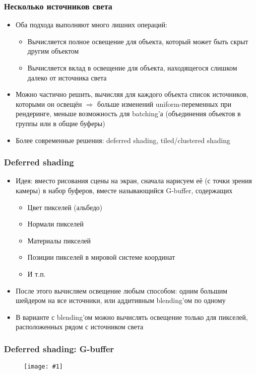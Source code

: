 \documentclass{beamer}
\newcommand{\slideimage}[1]{
  \begin{figure}
    \begin{adjustbox}{width=\textwidth, totalheight=\textheight-2\baselineskip-2\baselineskip,keepaspectratio}
      \texttt{[image: \#1]}
    \end{adjustbox}
  \end{figure}
}
\begin{document}
\begin{frame}[fragile]
\frametitle{Несколько источников света}
\begin{itemize}
\item Оба подхода выполняют много лишних операций:
\begin{itemize}
\item Вычисляется полное освещение для объекта, который может быть скрыт другим объектом
\pause
\item Вычисляется вклад в освещение для объекта, находящегося слишком далеко от источника света
\end{itemize}
\pause
\item Можно частично решить, вычисляя для каждого объекта список источников, которыми он освещён \begin{math}\Rightarrow\end{math} больше изменений uniform-переменных при рендеринге, меньше возможность для batching'а (объединения объектов в группы или в общие буферы)
\pause
\item Более современные решения: deferred shading, tiled/clustered shading
\end{itemize}
\end{frame}

\begin{frame}[fragile]
\frametitle{Deferred shading}
\begin{itemize}
\item Идея: вместо рисования сцены на экран, сначала нарисуем её (с точки зрения камеры) в набор буферов, вместе называющийся G-buffer, содержащих
\begin{itemize}
\item Цвет пикселей (альбедо)
\item Нормали пикселей
\item Материалы пикселей
\item Позиции пикселей в мировой системе координат
\item И т.п.
\end{itemize}
\pause
\item После этого вычисляем освещение любым способом: одним большим шейдером на все источники, или аддитивным blending'ом по одному
\pause
\item В варианте с blending'ом можно вычислять освещение только для пикселей, расположенных рядом с источником света
\end{itemize}
\end{frame}

\begin{frame}[fragile]
\frametitle{Deferred shading: G-buffer}
\slideimage{g_buffer.png}
\end{frame}
\end{document}
